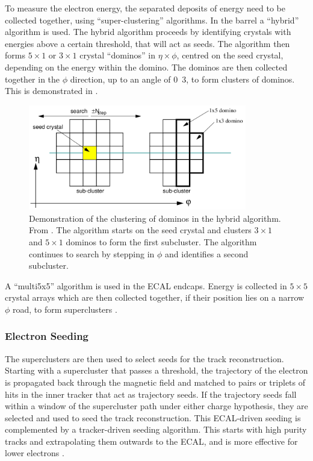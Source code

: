 To measure the electron energy, the separated deposits of energy need to be
collected together, using ``super-clustering'' algorithms. 
In the barrel a ``hybrid'' algorithm is used. The hybrid algorithm proceeds by
identifying crystals with energies above a certain threshold, that will act as
seeds. The algorithm then forms $5\times1$ or $3\times1$ crystal ``dominos'' in
$\eta\times\phi$, centred on the seed crystal, depending on the
energy within the domino. The dominos are then collected together in the $\phi$
direction, up to an angle of \unit{0.3}{\rad}, to form clusters of dominos.
This is demonstrated in  \cite{meschi2001electron}.

\begin{figure}[htbp]
  \centering
  \includegraphics[width=0.85\textwidth]{hybridalgo}
  \caption[Demonstration of the clustering of dominos in the hybrid algorithm.]
{Demonstration of the clustering of dominos in the hybrid algorithm.  From
\cite{meschi2001electron}. The algorithm starts on the seed crystal and clusters
$3\times1$ and $5\times1$ dominos to form the first subcluster. The algorithm
continues to search by stepping in $\phi$ and identifies a second subcluster.}
  \label{fig:hybrid}
\end{figure}

A ``multi5x5'' algorithm is used in the ECAL endcaps. Energy is collected in
$5\times5$ crystal arrays which are then collected together, if their position lies on
a narrow $\phi$ road, to form superclusters \cite{meschi2001electron}.

\subsubsection{Electron Seeding}
The superclusters are then used to select seeds for the track reconstruction.
Starting with a supercluster that passes a \pt threshold,
the trajectory of the electron is propagated back through the magnetic field and
matched to pairs or triplets of hits in the inner tracker that act as trajectory
seeds.  If the trajectory seeds fall within a window of the supercluster path
under either charge hypothesis, they are selected and used to seed the track
reconstruction.  This ECAL-driven seeding is complemented by a tracker-driven
seeding algorithm.  This starts with high purity tracks and extrapolating them
outwards to the ECAL, and is more effective for lower \pt electrons
\cite{baffioni2007electron,adam2009electron}.

